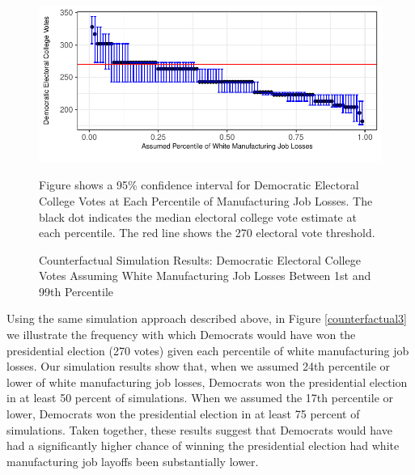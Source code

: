 \documentclass[]{AEA}
\begin{document}
\FloatBarrier
\begin{figure} \label{counterfactual2}

\caption{Counterfactual Simulation Results: Democratic Electoral College Votes Assuming White Manufacturing Job Losses Between 1st and 99th Percentile }

\begin{center}\includegraphics{Final-Draft_files/figure-latex/unnamed-chunk-7-1} \end{center}



\FloatBarrier
\begin{figurenotes}
Figure shows a 95\% confidence interval for Democratic Electoral College Votes at Each Percentile of Manufacturing Job Losses. The black dot indicates the median electoral college vote estimate at each percentile. The red line shows the 270 electoral vote threshold.
\end{figurenotes}
\end{figure}
\FloatBarrier

Using the same simulation approach described above, in Figure
\ref{counterfactual3} we illustrate the frequency with which Democrats
would have won the presidential election (270 votes) given each
percentile of white manufacturing job losses. Our simulation results
show that, when we assumed 24th percentile or lower of white
manufacturing job losses, Democrats won the presidential election in at
least 50 percent of simulations. When we assumed the 17th percentile or
lower, Democrats won the presidential election in at least 75 percent of
simulations. Taken together, these results suggest that Democrats would
have had a significantly higher chance of winning the presidential
election had white manufacturing job layoffs been substantially lower.
\end{document}
